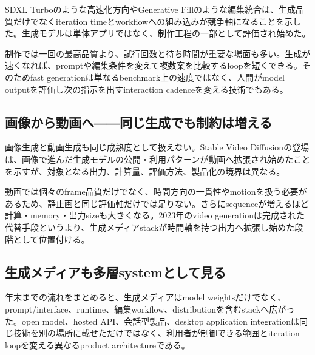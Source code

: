 SDXL Turboのような高速化方向やGenerative Fillのような編集統合は、生成品質だけでなくiteration timeとworkflowへの組み込みが競争軸になることを示した。生成モデルは単体アプリではなく、制作工程の一部として評価され始めた。\autocite{src-091bbe9dbf4e,src-18f22707bf78,src-2b694ab9a461,src-317afaba6510,src-9da0d929aa45,src-a4f61fbe35c5,src-e79065444906}


制作では一回の最高品質より、試行回数と待ち時間が重要な場面も多い。生成が速くなれば、promptや編集条件を変えて複数案を比較するloopを短くできる。そのためfast generationは単なるbenchmark上の速度ではなく、人間がmodel outputを評価し次の指示を出すinteraction cadenceを変える技術でもある。\autocite{src-091bbe9dbf4e,src-18f22707bf78,src-317afaba6510,src-9da0d929aa45,src-e79065444906}


\subsection{画像から動画へ――同じ生成でも制約は増える}

画像生成と動画生成も同じ成熟度として扱えない。Stable Video Diffusionの登場は、画像で進んだ生成モデルの公開・利用パターンが動画へ拡張され始めたことを示すが、対象となる出力、計算量、評価方法、製品化の境界は異なる。\autocite{src-091bbe9dbf4e,src-096341c0ccf6,src-0b410c70bfc7,src-18f22707bf78,src-2c97fc5583a3,src-317afaba6510,src-9da0d929aa45,src-e79065444906}


動画では個々のframe品質だけでなく、時間方向の一貫性やmotionを扱う必要があるため、静止画と同じ評価軸だけでは足りない。さらにsequenceが増えるほど計算・memory・出力sizeも大きくなる。2023年のvideo generationは完成された代替手段というより、生成メディアstackが時間軸を持つ出力へ拡張し始めた段階として位置付ける。\autocite{src-096341c0ccf6,src-0b410c70bfc7,src-2c97fc5583a3}


\subsection{生成メディアも多層systemとして見る}

年末までの流れをまとめると、生成メディアはmodel weightsだけでなく、prompt/interface、runtime、編集workflow、distributionを含むstackへ広がった。open model、hosted API、会話型製品、desktop application integrationは同じ技術を別の場所に載せただけではなく、利用者が制御できる範囲とiteration loopを変える異なるproduct architectureである。\autocite{src-091bbe9dbf4e,src-096341c0ccf6,src-0b410c70bfc7,src-18f22707bf78,src-2b694ab9a461,src-2c97fc5583a3,src-317afaba6510,src-9bc8e7751f80,src-9da0d929aa45,src-a4f61fbe35c5,src-ba80e5e27a11,src-e79065444906}


